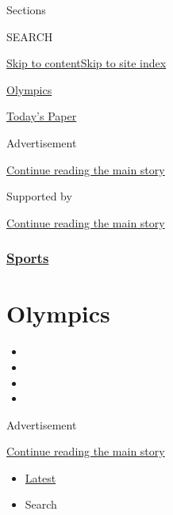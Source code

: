 Sections

SEARCH

\protect\hyperlink{site-content}{Skip to
content}\protect\hyperlink{site-index}{Skip to site index}

\href{https://www.nytimes.com/news-event/winter-olympics-2018}{Olympics}

\href{https://myaccount.nytimes.com/auth/login?response_type=cookie\&client_id=vi}{}

\href{https://www.nytimes.com/section/todayspaper}{Today's Paper}

Advertisement

\protect\hyperlink{after-top}{Continue reading the main story}

Supported by

\protect\hyperlink{after-sponsor}{Continue reading the main story}

\hypertarget{sports}{%
\subsubsection{\texorpdfstring{\href{/section/sports}{Sports}}{Sports}}\label{sports}}

\hypertarget{olympics}{%
\section{Olympics}\label{olympics}}

\begin{itemize}
\item
\item
\item
\item
\end{itemize}

Advertisement

\protect\hyperlink{after-subheader}{Continue reading the main story}

\begin{itemize}
\tightlist
\item
  \protect\hyperlink{stream-panel}{Latest}
\item
  Search
\end{itemize}

